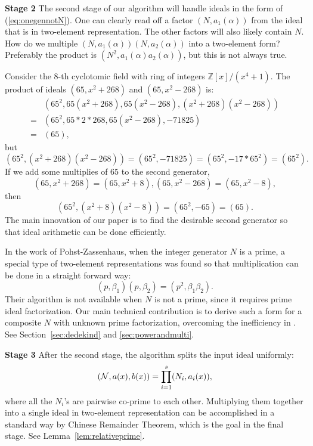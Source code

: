 \documentclass[runningheads, letter]{llncs}
\newcommand{\Z}{{\mathbb Z}}
\begin{document}
{\bf Stage 2}
The second stage of our algorithm will handle
ideals in the form of (\ref{eq:onegennotN}).
One can clearly read off a factor \( (N, a_1(\alpha)) \)
from the ideal that is in two-element representation.
The other factors will also likely contain \( N \).
%
How do we multiple \( (N, a_1(\alpha)) (N, a_2(\alpha)) \)
into a two-element form? Preferably the product is
\( (N^2, a_1(\alpha) a_2(\alpha)) \),
but this is not always true.
\begin{example}\label{ex:1}
  Consider the 8-th cyclotomic field with ring of
  integers \( \Z[x]/(x^4+1)  \).
  The product of ideals \( (65, x^2 + 268) \) and \( (65, x^2 - 268) \)
  is:
  \begin{align*}
    & (65^2, 65(x^2+268), 65(x^2-268), (x^2+268)(x^2-268)) \\
    =& (65^2, 65 * 2 * 268, 65(x^2-268), -71825)\\
    =& (65),
  \end{align*}
  but
\[  (65^2, (x^2+268)(x^2-268)) = (65^2, -71825)
  = (65^2, -17 * 65^2) = (65^2). \]
  If we add  some
  multiplies of \( 65 \) to the second generator,
  \[ (65, x^2 + 268)=(65, x^2+8), (65, x^2 - 268)
    = (65, x^2-8),\]
  then
\[  (65^2, (x^2+8)(x^2-8)) = (65^2, -65) = (65). \]
%
%
The main innovation of our paper is to find 
the desirable second generator so that ideal arithmetic can
be done efficiently.
%
\end{example}
%
In the work of Pohst-Zassenhaus, when the integer generator
\( N \) is a prime, a special type of two-element representations
was found so that multiplication can be done
in a straight forward way:
\[ (p, \beta_1) (p, \beta_2) = (p^2, \beta_1 \beta_2 ). \]
%
%
Their algorithm is not available when \( N \) is not a prime,
since it requires prime ideal factorization.
Our main technical contribution is to  derive such a form
for a composite \( N \) with unknown prime factorization,
%
%
%
 overcoming the inefficiency in
 \cite[Subsection 6.3.2]{Belabas04}.
 See Section~\ref{sec:dedekind} and
\ref{sec:powerandmulti}.
%
%
%
%
%
%

{\bf Stage 3} After the second stage,
the algorithm splits the input ideal uniformly:
\[ ({\cal N}, a(x), b(x)) = \prod_{i=1}^s (N_i, a_i (x)), \]
where all the \( N_i \)'s are pairwise co-prime to each other.
Multiplying them together into a single ideal
in two-element representation
can be accomplished in a standard way by Chinese Remainder Theorem,
which is the goal in the final stage.
 See Lemma~\ref{lem:relativeprime}.
%
%
%
\end{document}
